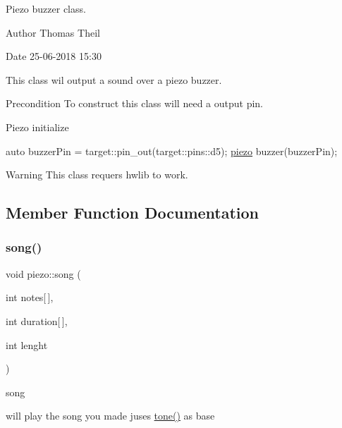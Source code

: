 Piezo buzzer class. 

\begin{DoxyAuthor}{Author}
Thomas Theil 
\end{DoxyAuthor}
\begin{DoxyDate}{Date}
25-\/06-\/2018 15\+:30
\end{DoxyDate}
This class wil output a sound over a piezo buzzer. ~\newline
 \begin{DoxyPrecond}{Precondition}
To construct this class will need a output pin. 
\end{DoxyPrecond}
Piezo initialize 
\begin{DoxyCode}
\textcolor{keyword}{auto} buzzerPin  = target::pin\_out(target::pins::d5);
\mbox{\hyperlink{classpiezo}{piezo}} buzzer(buzzerPin);
\end{DoxyCode}


\begin{DoxyWarning}{Warning}
This class requers hwlib to work. 
\end{DoxyWarning}


\subsection{Member Function Documentation}
\mbox{\label{classpiezo_a4e92d8bc5b101f9862a089134518c55f}} 
\subsubsection{\texorpdfstring{song()}{song()}}
{\footnotesize\ttfamily void piezo\+::song (\begin{DoxyParamCaption}\item[{int}]{notes\mbox{[}$\,$\mbox{]},  }\item[{int}]{duration\mbox{[}$\,$\mbox{]},  }\item[{int}]{lenght }\end{DoxyParamCaption})}



song 

will play the song you made juses \mbox{\hyperlink{classpiezo_ac14361f4fb7fe063b8c4455946220ee4}{tone()}} as base


